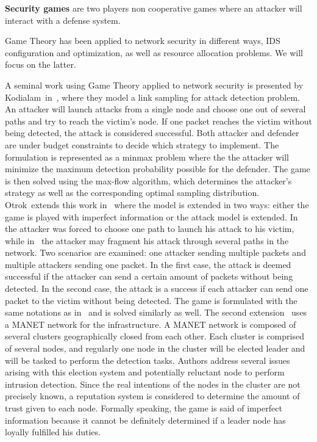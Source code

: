 \textbf{Security games} are two players non cooperative games where an attacker will interact with a defense system.

Game Theory has been applied to network security in different ways, IDS configuration and optimization, as well as resource allocation problems. We will focus on the latter.

 A seminal work using Game Theory applied to network security is presented by Kodialam~\etal in~\cite{MuraliKodialam2003}, where they model a link sampling for attack detection problem.
 An attacker will launch attacks from a single node and choose one out of several paths and try to reach the victim's node.
 If one packet reaches the victim without being detected, the attack is considered successful.
 Both attacker and defender are under budget constraints to decide which strategy to implement.
 The formulation is represented as a minmax problem where the the attacker will minimize the maximum detection probability possible for the defender.
 The game is then solved using the max-flow algorithm, which determines the attacker's strategy as well as the corresponding optimal sampling distribution.
 Otrok~\etal extends this work in~\cite{otrok1,otrok2} where the model is extended in two ways: either the game is played with imperfect information or the attack model is extended.
 In~\cite{MuraliKodialam2003} the attacker was forced to choose one path to launch his attack to his victim, while in~\cite{otrok1} the attacker may fragment his attack through several paths in the network.
 Two scenarios are examined: one attacker sending multiple packets and multiple attackers sending one packet.
 In the first case, the attack is deemed successful if the attacker can send a certain amount of packets without being detected.
 In the second case, the attack is a success if each attacker can send one packet to the victim without being detected.
 The game is formulated with the same notations as in~\cite{MuraliKodialam2003} and is solved similarly as well.
 The second extension~\cite{otrok2} uses a MANET network for the infrastructure.
 A MANET network is composed of several clusters geographically closed from each other.
 Each cluster is comprised of several nodes, and regularly one node in the cluster will be elected leader and will be tasked to perform the detection tasks. Authors address several issues arising with this election system and potentially reluctant node to perform intrusion detection.
 Since the real intentions of the nodes in the cluster are not precisely known, a reputation system is considered to determine the amount of trust given to each node.
 Formally speaking, the game is said of imperfect information because it cannot be definitely determined if a leader node has loyally fulfilled his duties.
 
